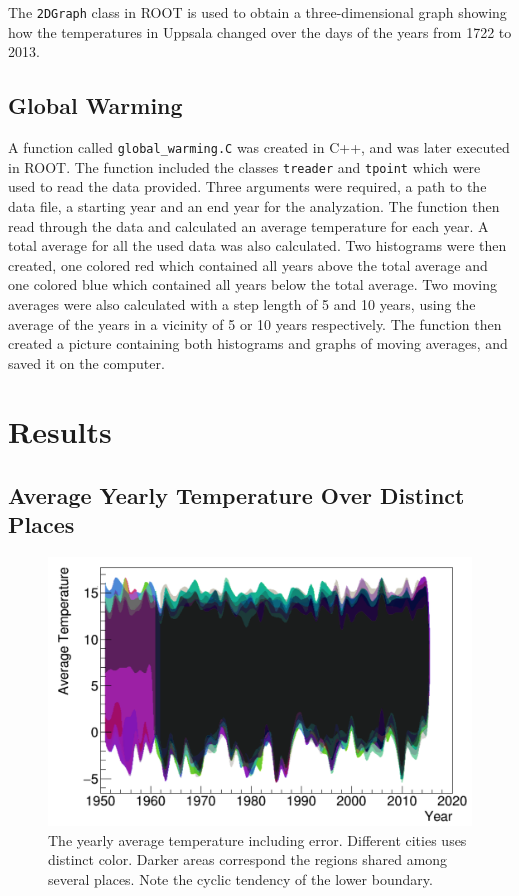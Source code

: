\documentclass[a4paper]{article}
\begin{document}
The \texttt{2DGraph} class in ROOT is used to obtain a three-dimensional graph showing how the temperatures in Uppsala changed over the days of 
the years from 1722 to 2013.

\subsection{Global Warming}

A function called \texttt{global\_warming.C} was created in C++, and was later executed in ROOT. The function included the classes \texttt{treader} and \texttt{tpoint} which were used to read the data provided. Three arguments were required, a path to the data file, a starting year and an end year for the analyzation. The function then read through the data and calculated an average temperature for each year. A total average for all the used data was also calculated. Two histograms were then created, one colored red which contained all years above the total average and one colored blue which contained all years below the total average. Two moving averages were also calculated with a step length of 5 and 10 years, using the average of the years in a vicinity of 5 or 10 years respectively. The function then created a picture containing both histograms and graphs of moving averages, and saved it on the computer.


\section{Results}\label{sec:Results}

\subsection{Average Yearly Temperature Over Distinct Places}

\begin{figure}[H]
\begin{center}
\includegraphics[scale=.3]{2.png}
\caption{The yearly average temperature including error. Different cities uses distinct color. Darker areas correspond the regions shared among several places. Note the cyclic tendency of the lower boundary.}
\label{fig:johan}
\end{center}
\end{figure}
\end{document}
